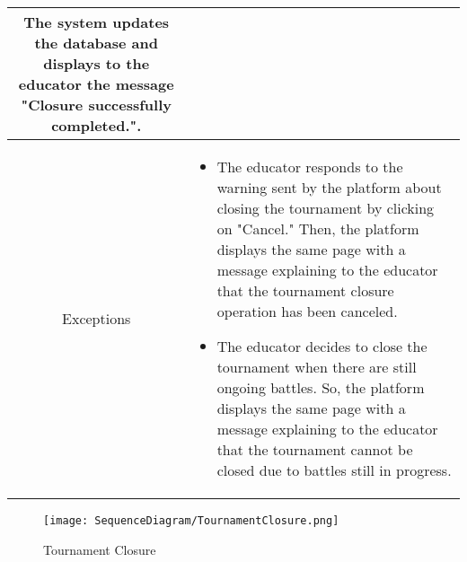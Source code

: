 \begin{longtable}{|c| p{10cm}|}
            The system updates the database and displays to the educator the message "Closure successfully completed.".
            \\
        \hline
         Exceptions &\begin{itemize}
             \item The educator responds to the warning sent by the platform about closing the tournament by clicking on "Cancel." Then, the platform displays the same page with a message explaining to the educator that the tournament closure operation has been canceled.
             \item The educator decides to close the tournament when there are still ongoing battles. So, the platform displays the same page with a message explaining to the educator that the tournament cannot be closed due to battles still in progress.
         \end{itemize} \\
             \hline
         
            
    \end{longtable}

    \begin{figure}[H]
  \texttt{[image: SequenceDiagram/TournamentClosure.png]} 
  \caption{Tournament Closure}
  \label{fig:immagine}
\end{figure}

\newpage
